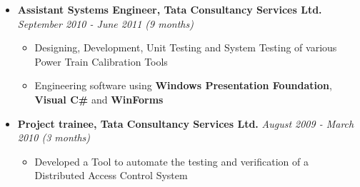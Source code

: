 \begin{itemize}
	\item \textbf{Assistant Systems Engineer, Tata Consultancy Services Ltd.} \hfill \emph{September 2010 - June 2011 (9 months)} \\[-0.6cm]
		\begin{itemize}
			\item Designing, Development, Unit Testing and System Testing of various Power Train Calibration Tools \\[-0.5cm]
			\item Engineering software using \textbf{Windows Presentation Foundation}, \textbf{Visual C\#} and \textbf{WinForms} \\[-0.6cm]
		\end{itemize}
	\item \textbf{Project trainee, Tata Consultancy Services Ltd.} \hfill \emph{August 2009 - March 2010 (3 months)} \\[-0.6cm]
		\begin{itemize}
			\item Developed a Tool to automate the testing and verification of a Distributed Access Control System \\[-0.5cm]
		\end{itemize}
\end{itemize}